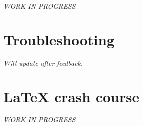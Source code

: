 \documentclass[a4paper,12pt,twoside]{article}
\begin{document}
        \emph{WORK IN PROGRESS}
        
    
        \section{Troubleshooting}
            \emph{Will update after feedback}. 

        \section{LaTeX crash course} 
        \label{sec:crashcourse}
        \emph{WORK IN PROGRESS}
\end{document}
